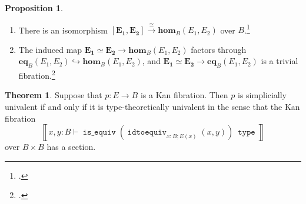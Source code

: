 \documentclass[10pt,letterpaper,cm]{nupset}
\theoremstyle{definition}
\theoremstyle{theorem}
\newtheorem{theorem}[definition]{Theorem}
\newtheorem{prop}[definition]{Proposition}
\theoremstyle{remark}
\newcommand{\0}{\mathbf{0}}
\newcommand{\1}{\mathbf{1}}
\newcommand{\2}{\mathbf{2}}
\DeclareMathOperator{\type}{\mathtt{type}}
\DeclareMathOperator{\isequiv}{\mathtt{is\_equiv}}
\DeclareMathOperator{\equiveq}{\mathtt{idtoequiv}}
\newcommand{\be}{\begin{enumerate}}
\newcommand{\ee}{\end{enumerate}}
\begin{document}
\begin{prop}\label{funciso} $ $
\be[label=(\arabic*)]
\item There is an isomorphism $\mathbf{\left[E_1, E_2\right]} \overset{\cong}{\longrightarrow} \mathbf{hom}_B(E_1, E_2)$ over $B$.\footnote{\autocite[Corollary 3.3.3]{KL}.}
\item The induced map $\mathbf{E_1 \simeq E_2} \to  \mathbf{hom}_B(E_1, E_2)$ factors through $\mathbf{eq}_B(E_1,E_2) \hookrightarrow   \mathbf{hom}_B(E_1, E_2)$, and $\mathbf{E_1 \simeq E_2} \to \mathbf{eq}_B(E_1,E_2)$ is a trivial fibration.\footnote{\autocite[Lemma 3.3.4]{KL}.}
\ee
\end{prop}

\smallskip


\begin{theorem}
Suppose that $p:E \to B$ is a Kan fibration.  Then $p$ is simplicially univalent if and only if it is type-theoretically univalent in the sense that the Kan fibration $$\left\llbracket{x,y:B \vdash \isequiv\left(\equiveq_{{x:B}; E(x)}(x,y)\right)\ \type}\right\rrbracket$$ over $B\times B$ has a section.
\end{theorem}
\end{document}
